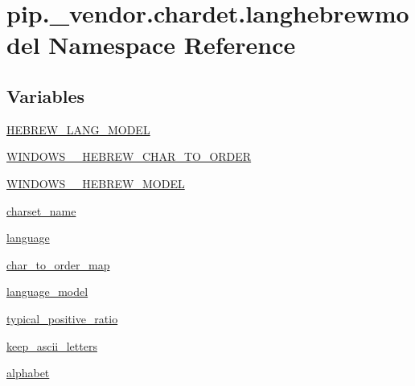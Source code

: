 \hypertarget{namespacepip_1_1__vendor_1_1chardet_1_1langhebrewmodel}{}\section{pip.\+\_\+vendor.\+chardet.\+langhebrewmodel Namespace Reference}
\label{namespacepip_1_1__vendor_1_1chardet_1_1langhebrewmodel}
\subsection*{Variables}
\begin{DoxyCompactItemize}
\item 
\hyperlink{namespacepip_1_1__vendor_1_1chardet_1_1langhebrewmodel_ac85015db7bf807f40cf888a222a8f6e5}{H\+E\+B\+R\+E\+W\+\_\+\+L\+A\+N\+G\+\_\+\+M\+O\+D\+EL}
\item 
\hyperlink{namespacepip_1_1__vendor_1_1chardet_1_1langhebrewmodel_a2b7be97016e4117b3f0953994ccf3bd0}{W\+I\+N\+D\+O\+W\+S\+\_\+\_\+\+H\+E\+B\+R\+E\+W\+\_\+\+C\+H\+A\+R\+\_\+\+T\+O\+\_\+\+O\+R\+D\+ER}
\item 
\hyperlink{namespacepip_1_1__vendor_1_1chardet_1_1langhebrewmodel_a664fd5c98e901fc2598f16969e7eb412}{W\+I\+N\+D\+O\+W\+S\+\_\+\_\+\+H\+E\+B\+R\+E\+W\+\_\+\+M\+O\+D\+EL}
\item 
\hyperlink{namespacepip_1_1__vendor_1_1chardet_1_1langhebrewmodel_ac83c94d8c6c532a14b6320f046fb2a7c}{charset\+\_\+name}
\item 
\hyperlink{namespacepip_1_1__vendor_1_1chardet_1_1langhebrewmodel_ab30170e3db47f07ab4dff8de5ee014d0}{language}
\item 
\hyperlink{namespacepip_1_1__vendor_1_1chardet_1_1langhebrewmodel_a362a78bbb5f1257fc6aa614677997d7e}{char\+\_\+to\+\_\+order\+\_\+map}
\item 
\hyperlink{namespacepip_1_1__vendor_1_1chardet_1_1langhebrewmodel_a8e68a62abe9029670f2ccafaa18fa0e6}{language\+\_\+model}
\item 
\hyperlink{namespacepip_1_1__vendor_1_1chardet_1_1langhebrewmodel_a044a9a93d650020d57cb26e59e395b33}{typical\+\_\+positive\+\_\+ratio}
\item 
\hyperlink{namespacepip_1_1__vendor_1_1chardet_1_1langhebrewmodel_a68b0036c53576d3e65ba6184b155c6b7}{keep\+\_\+ascii\+\_\+letters}
\item 
\hyperlink{namespacepip_1_1__vendor_1_1chardet_1_1langhebrewmodel_afc2f0cb6bda7b80a268c48591a9754f9}{alphabet}
\end{DoxyCompactItemize}


